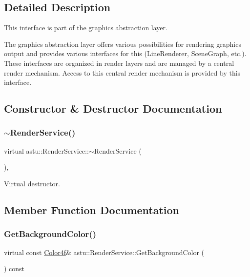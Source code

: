 \subsection{Detailed Description}
This interface is part of the graphics abstraction layer.

The graphics abstraction layer offers various possibilities for rendering graphics output and provides various interfaces for this (Line\+Renderer, Scene\+Graph, etc.). These interfaces are organized in render layers and are managed by a central render mechanism. Access to this central render mechanism is provided by this interface. 

\subsection{Constructor \& Destructor Documentation}
\mbox{\label{classastu_1_1RenderService_a76df2f3da25b9df58a6f4d93ae2720e5}} 
\subsubsection{\texorpdfstring{$\sim$\+Render\+Service()}{~RenderService()}}
{\footnotesize\ttfamily virtual astu\+::\+Render\+Service\+::$\sim$\+Render\+Service (\begin{DoxyParamCaption}{ }\end{DoxyParamCaption})\hspace{0.3cm}{\ttfamily [inline]}, {\ttfamily [virtual]}}

Virtual destructor. 

\subsection{Member Function Documentation}
\mbox{\label{classastu_1_1RenderService_a5491abad694b7d662f67b4d4bc858e87}} 
\subsubsection{\texorpdfstring{Get\+Background\+Color()}{GetBackgroundColor()}}
{\footnotesize\ttfamily virtual const \hyperlink{classastu_1_1Color}{Color4f}\& astu\+::\+Render\+Service\+::\+Get\+Background\+Color (\begin{DoxyParamCaption}{ }\end{DoxyParamCaption}) const\hspace{0.3cm}{\ttfamily [pure virtual]}}

